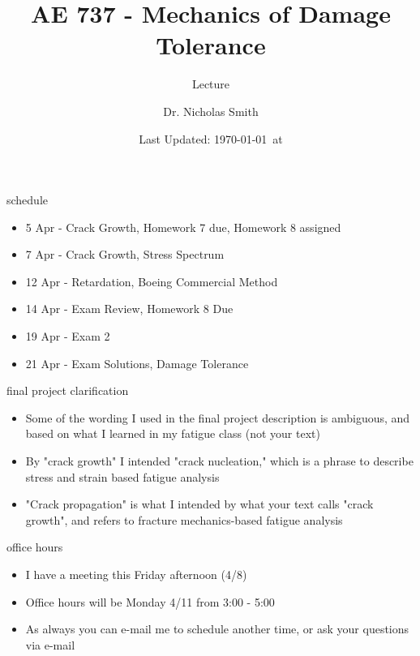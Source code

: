 \documentclass[10pt]{beamer}
\title{AE 737 - Mechanics of Damage Tolerance}
\subtitle{Lecture \arabic{lecture}}
\date{Last Updated: \today\ at \DTMcurrenttime}
\author{Dr. Nicholas Smith}
\institute{Wichita State University, Department of Aerospace Engineering}
\begin{document}
\maketitle
\begin{frame}{schedule}
	\begin{itemize}
		\item 5 Apr - Crack Growth, Homework 7 due, Homework 8 assigned
		\item 7 Apr - Crack Growth, Stress Spectrum
		\item 12 Apr - Retardation, Boeing Commercial Method
		\item 14 Apr - Exam Review, Homework 8 Due
		\item 19 Apr - Exam 2
		\item 21 Apr - Exam Solutions, Damage Tolerance
	\end{itemize}
\end{frame}

\begin{frame}{final project clarification}
	\begin{itemize}[<+->]
		\item Some of the wording I used in the final project description is ambiguous, and based on what I learned in my fatigue class (not your text)
		\item By "crack growth" I intended "crack nucleation," which is a phrase to describe stress and strain based fatigue analysis
		\item "Crack propagation" is what I intended by what your text calls "crack growth", and refers to fracture mechanics-based fatigue analysis
	\end{itemize}
\end{frame}

\begin{frame}{office hours}
	\begin{itemize}
		\item I have a meeting this Friday afternoon (4/8)
		\item Office hours will be Monday 4/11 from 3:00 - 5:00
		\item As always you can e-mail me to schedule another time, or ask your questions via e-mail
	\end{itemize}
\end{frame}
\end{document}
